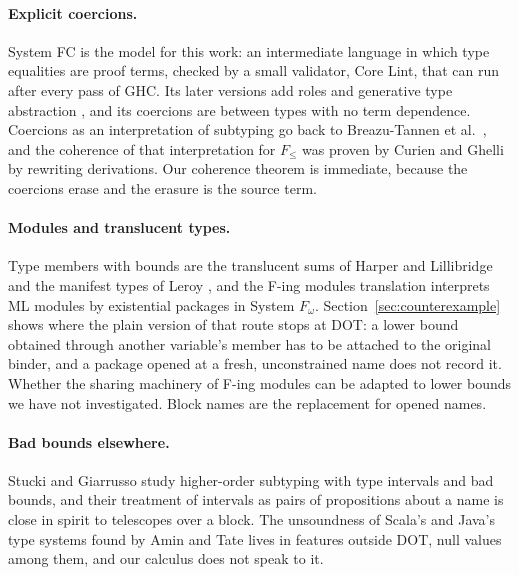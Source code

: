 \paragraph{Explicit coercions.}
System FC \cite{sulzmann2007fc} is the model for this work: an intermediate language in which type equalities are proof terms, checked by a small validator, Core Lint, that can run after every pass of GHC. Its later versions add roles \cite{breitner2016safe} and generative type abstraction \cite{weirich2011generative}, and its coercions are between types with no term dependence. Coercions as an interpretation of subtyping go back to Breazu-Tannen et al.\ \cite{breazu1991inheritance}, and the coherence of that interpretation for $F_{\le}$ was proven by Curien and Ghelli \cite{curien1992coherence} by rewriting derivations. Our coherence theorem is immediate, because the coercions erase and the erasure is the source term.

\paragraph{Modules and translucent types.}
Type members with bounds are the translucent sums of Harper and Lillibridge \cite{harper1994translucent} and the manifest types of Leroy \cite{leroy1994manifest}, and the F-ing modules translation \cite{rossberg2014fing} interprets ML modules by existential packages in System $F_\omega$. Section~\ref{sec:counterexample} shows where the plain version of that route stops at DOT: a lower bound obtained through another variable's member has to be attached to the original binder, and a package opened at a fresh, unconstrained name does not record it. Whether the sharing machinery of F-ing modules can be adapted to lower bounds we have not investigated. Block names are the replacement for opened names.

\paragraph{Bad bounds elsewhere.}
Stucki and Giarrusso \cite{stucki2021intervals} study higher-order subtyping with type intervals and bad bounds, and their treatment of intervals as pairs of propositions about a name is close in spirit to telescopes over a block. The unsoundness of Scala's and Java's type systems found by Amin and Tate \cite{amin2016unsound} lives in features outside DOT, null values among them, and our calculus does not speak to it.
